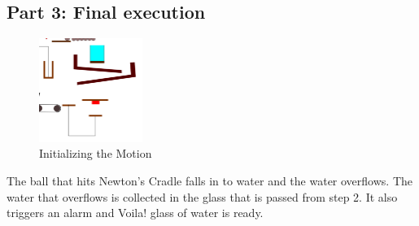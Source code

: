 \documentclass[a4paper,10pt]{article}
\begin{document}
\subsection*{Part 3: Final execution}
\begin{figure}

\begin{center}
\vspace{-30pt}
\includegraphics[width=0.3\textwidth]{img_p3}

\caption{Initializing the Motion}
\end{center}
\end{figure}
\hfill \break The ball that hits Newton's Cradle falls in to water and the water overflows. The water that overflows is collected in the glass that is passed from step 2. It also triggers an alarm and Voila! glass of water is ready.\\ \\
\clearpage
 


 
 \medskip
 
%
%
%

\printbibliography
\nocite{ShareLatex}
\end{document}
